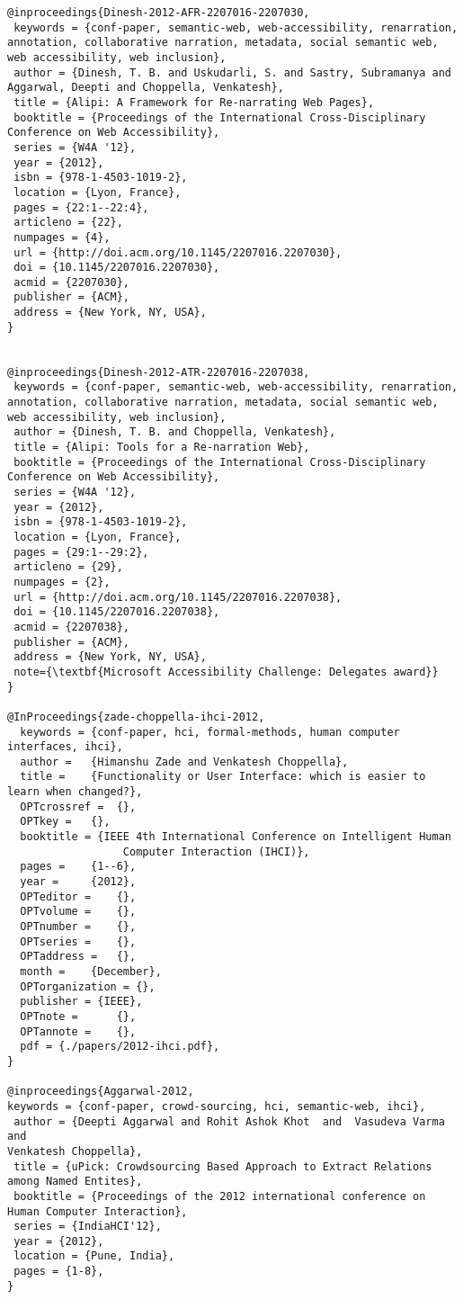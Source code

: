 \documentclass[11pt]{article}
\begin{document}
\begin{lstlisting}
@inproceedings{Dinesh-2012-AFR-2207016-2207030,
 keywords = {conf-paper, semantic-web, web-accessibility, renarration, annotation, collaborative narration, metadata, social semantic web, web accessibility, web inclusion},
 author = {Dinesh, T. B. and Uskudarli, S. and Sastry, Subramanya and Aggarwal, Deepti and Choppella, Venkatesh},
 title = {Alipi: A Framework for Re-narrating Web Pages},
 booktitle = {Proceedings of the International Cross-Disciplinary Conference on Web Accessibility},
 series = {W4A '12},
 year = {2012},
 isbn = {978-1-4503-1019-2},
 location = {Lyon, France},
 pages = {22:1--22:4},
 articleno = {22},
 numpages = {4},
 url = {http://doi.acm.org/10.1145/2207016.2207030},
 doi = {10.1145/2207016.2207030},
 acmid = {2207030},
 publisher = {ACM},
 address = {New York, NY, USA},
}


@inproceedings{Dinesh-2012-ATR-2207016-2207038,
 keywords = {conf-paper, semantic-web, web-accessibility, renarration, annotation, collaborative narration, metadata, social semantic web, web accessibility, web inclusion},
 author = {Dinesh, T. B. and Choppella, Venkatesh},
 title = {Alipi: Tools for a Re-narration Web},
 booktitle = {Proceedings of the International Cross-Disciplinary Conference on Web Accessibility},
 series = {W4A '12},
 year = {2012},
 isbn = {978-1-4503-1019-2},
 location = {Lyon, France},
 pages = {29:1--29:2},
 articleno = {29},
 numpages = {2},
 url = {http://doi.acm.org/10.1145/2207016.2207038},
 doi = {10.1145/2207016.2207038},
 acmid = {2207038},
 publisher = {ACM},
 address = {New York, NY, USA},
 note={\textbf{Microsoft Accessibility Challenge: Delegates award}}
}

@InProceedings{zade-choppella-ihci-2012,
  keywords = {conf-paper, hci, formal-methods, human computer interfaces, ihci},
  author = 	 {Himanshu Zade and Venkatesh Choppella},
  title = 	 {Functionality or User Interface: which is easier to learn when changed?},
  OPTcrossref =  {},
  OPTkey = 	 {},
  booktitle = {IEEE 4th International Conference on Intelligent Human
                  Computer Interaction (IHCI)},
  pages = 	 {1--6},
  year = 	 {2012},
  OPTeditor = 	 {},
  OPTvolume = 	 {},
  OPTnumber = 	 {},
  OPTseries = 	 {},
  OPTaddress = 	 {},
  month = 	 {December},
  OPTorganization = {},
  publisher = {IEEE},
  OPTnote = 	 {},
  OPTannote = 	 {},
  pdf = {./papers/2012-ihci.pdf},
}

@inproceedings{Aggarwal-2012,
keywords = {conf-paper, crowd-sourcing, hci, semantic-web, ihci},
 author = {Deepti Aggarwal and Rohit Ashok Khot  and  Vasudeva Varma  and
Venkatesh Choppella},
 title = {uPick: Crowdsourcing Based Approach to Extract Relations
among Named Entites},
 booktitle = {Proceedings of the 2012 international conference on
Human Computer Interaction},
 series = {IndiaHCI'12},
 year = {2012},
 location = {Pune, India},
 pages = {1-8},
}

\end{lstlisting}
\end{document}
